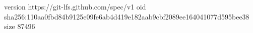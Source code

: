version https://git-lfs.github.com/spec/v1
oid sha256:110aa0fbd84b9125e09fe6ab4d419e182aab9cbf2089ee164041077d595bee38
size 87496
